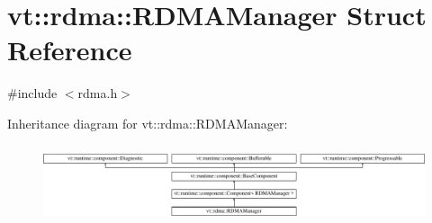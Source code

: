 \hypertarget{structvt_1_1rdma_1_1_r_d_m_a_manager}{}\section{vt\+:\+:rdma\+:\+:R\+D\+M\+A\+Manager Struct Reference}
\label{structvt_1_1rdma_1_1_r_d_m_a_manager}


{\ttfamily \#include $<$rdma.\+h$>$}

Inheritance diagram for vt\+:\+:rdma\+:\+:R\+D\+M\+A\+Manager\+:\begin{figure}[H]
\begin{center}
\leavevmode
\includegraphics[height=2.297436cm]{structvt_1_1rdma_1_1_r_d_m_a_manager}
\end{center}
\end{figure}

